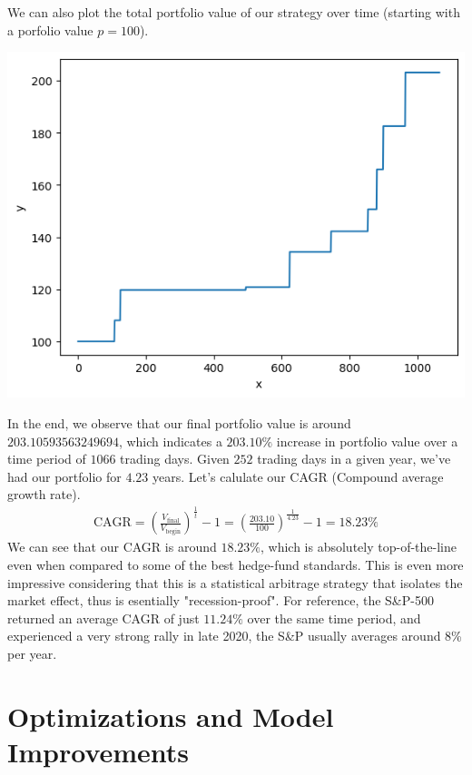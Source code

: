 \documentclass{article}
\begin{document}
\begin{spacing}{2.0}
\begin{center}
\end{center}
We can also plot the total portfolio value of our strategy over time (starting with a porfolio value $p=100$).
\begin{center}
    \includegraphics[scale=0.33]{./images/backtest_portfolio_value_1.png}
\end{center}
In the end, we observe that our final portfolio value is around $203.10593563249694$, which indicates a $203.10\%$ increase in portfolio value over a time period of $1066$ trading days.
Given $252$ trading days in a given year, we've had our portfolio for $4.23$ years. Let's calulate our CAGR (Compound average growth rate).
\begin{gather*}
    \text{CAGR} = \left ( \frac{V_{\text{final}}}{V_{\text{begin}}} \right )^{\frac{1}{t}} - 1 = \left ( \frac{203.10}{100} \right )^{\frac{1}{4.23}} - 1 = 18.23 \%
\end{gather*}
We can see that our CAGR is around $18.23 \%$, which is absolutely top-of-the-line even when compared to some of the best hedge-fund standards. This is even more impressive considering
that this is a statistical arbitrage strategy that isolates the market effect, thus is esentially "recession-proof". For reference, the S\&P-500 returned an average CAGR of just
$11.24 \%$ over the same time period, and experienced a very strong rally in late 2020, the S\&P usually averages around 8\% per year.

\section{Optimizations and Model Improvements}


\end{spacing}
\end{document}
